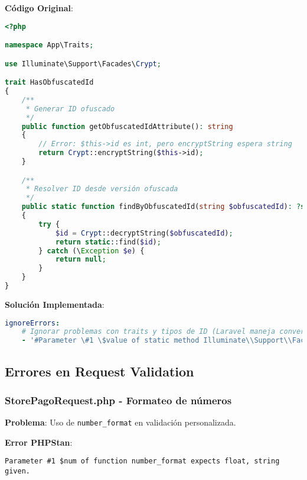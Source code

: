 \documentclass[12pt,a4paper]{article}
\begin{document}
\textbf{Código Original}:
\begin{lstlisting}[language=php, caption=HasObfuscatedId.php - Conversión de tipos]
<?php

namespace App\Traits;

use Illuminate\Support\Facades\Crypt;

trait HasObfuscatedId
{
    /**
     * Generar ID ofuscado
     */
    public function getObfuscatedIdAttribute(): string
    {
        // Error: $this->id es int, pero encryptString espera string
        return Crypt::encryptString($this->id);
    }

    /**
     * Resolver ID desde versión ofuscada
     */
    public static function findByObfuscatedId(string $obfuscatedId): ?self
    {
        try {
            $id = Crypt::decryptString($obfuscatedId);
            return static::find($id);
        } catch (\Exception $e) {
            return null;
        }
    }
}
\end{lstlisting}

\textbf{Solución Implementada}:
\begin{lstlisting}[language=yaml, caption=Ignorado para conversiones automáticas de Laravel]
ignoreErrors:
    # Ignorar problemas con traits y tipos de ID (Laravel maneja conversiones automáticamente)
    - '#Parameter \#1 \$value of static method Illuminate\\Support\\Facades\\Crypt::encryptString\(\) expects string, int given#'
\end{lstlisting}

\subsection{Errores en Request Validation}

\subsubsection{StorePagoRequest.php - Formateo de números}

\textbf{Problema}: Uso de \texttt{number\_format} en validación personalizada.

\textbf{Error PHPStan}:
\begin{lstlisting}[caption=Error en StorePagoRequest.php]
Parameter #1 $num of function number_format expects float, string given.
\end{lstlisting}
\end{document}

